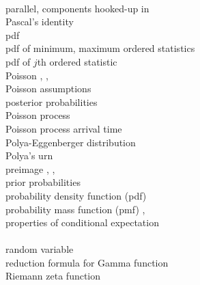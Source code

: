 \documentclass[12pt]{article}
\begin{document}
\\
\noindent parallel, components hooked-up in \pageref{seriesparallel}\\
\noindent Pascal's identity \pageref{pascalsidentity}\\
\noindent pdf \pageref{pdf}\\
\noindent pdf of minimum, maximum ordered statistics \pageref{pdfofminandmaxofiid}\\
\noindent pdf of $j$th ordered statistic \pageref{pdfofYj}\\
\noindent Poisson \pageref{poissoncalcfacts}, \pageref{d:poissonlambda}, \pageref{poissonpmf}\\
\noindent Poisson assumptions \pageref{poissonassumptions}\\
\noindent posterior probabilities \pageref{posteriorprob}\\
\noindent Poisson process \pageref{poissonprocess}\\
\noindent Poisson process arrival time \pageref{arrivaltime}\\
\noindent Polya-Eggenberger distribution \pageref{polyaeggenberger}\\
\noindent Polya's urn \pageref{polyaurn}\\
\noindent preimage \pageref{d:preimage}, \pageref{f:imagepreimage}, \pageref{e:preimage}\\
\noindent prior probabilities \pageref{priorprob}\\
\noindent probability density function (pdf) \pageref{pdf}\\
\noindent probability mass function (pmf) \pageref{e:pmf},\pageref{d:pmf}\\
\noindent properties of conditional expectation \pageref{propertiesofcondexp}\\

\\
\noindent random variable \pageref{d:rv}\\
\noindent reduction formula for Gamma function \pageref{reductionformula}\\
\noindent Riemann zeta function \pageref{riemannzeta}\\
\end{document}
